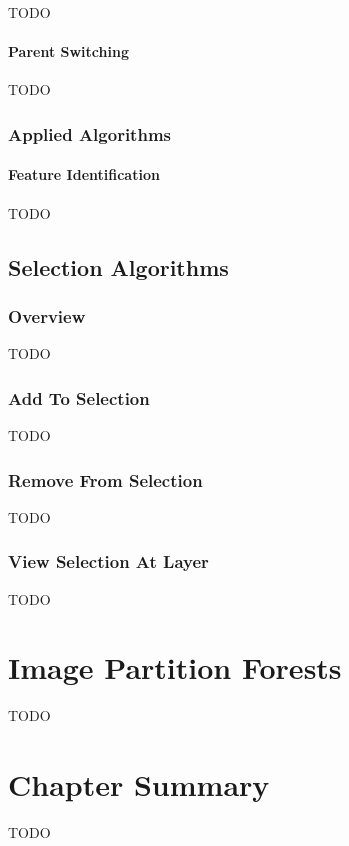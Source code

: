 TODO

\paragraph{Parent Switching}

TODO

\subsubsection{Applied Algorithms}

\paragraph{Feature Identification}

TODO

\subsection{Selection Algorithms}

\subsubsection{Overview}

TODO

\subsubsection{Add To Selection}

TODO

\subsubsection{Remove From Selection}

TODO

\subsubsection{View Selection At Layer}

TODO

\section{Image Partition Forests}

TODO

\section{Chapter Summary}

TODO
